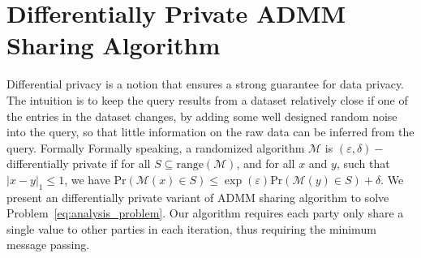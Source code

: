 \section{Differentially Private ADMM Sharing Algorithm}
\label{sec:admmSharing}
Differential privacy \cite{dwork2014algorithmic,zhou2010security} is a notion that ensures a strong guarantee for data privacy. The intuition is to keep the query results from a dataset relatively close if one of the entries in the dataset changes, by adding some well designed random noise into the query, so that little information on the raw data can be inferred from the query. Formally Formally speaking,
a randomized algorithm $\mathcal{M}$ is $(\varepsilon, \delta)-$differentially private if for all $S\subseteq\text{range}(\mathcal{M})$, and for all $x$ and $y$, such that $|x-y|_1\le 1$, we have
$
\text{Pr}(\mathcal{M}(x)\in S)\le \exp(\varepsilon)\text{Pr}(\mathcal{M}(y) \in S)+\delta.
$
We present an differentially private variant of ADMM sharing algorithm \cite{boyd2011distributed,hong2016convergence} to solve Problem~\eqref{eq:analysis_problem}. Our algorithm requires each party only share a single value to other parties in each iteration, thus requiring the minimum message passing. 

